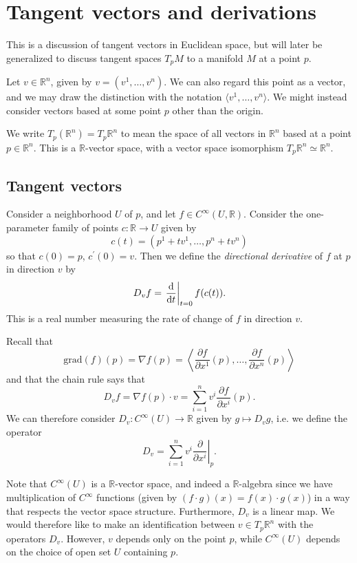 \section{Tangent vectors and derivations}

This is a discussion of tangent vectors in Euclidean space, but will
later be generalized to discuss tangent spaces $T_p M$ to a manifold
$M$ at a point $p$.

Let $v \in \mathbb{R}^n$, given by $v = (v^1, \dots, v^n)$. We can
also regard this point as a vector, and we may draw the distinction
with the notation $\langle v^1, \dots, v^n \rangle$. We might instead
consider vectors based at some point $p$ other than the origin.

We write $T_p(\mathbb{R}^n) = T_p \mathbb{R}^n$ to mean the space of
all vectors in $\mathbb{R}^n$ based at a point $p \in
\mathbb{R}^n$. This is a $\mathbb{R}$-vector space, with a vector
space isomorphism $T_p \mathbb{R}^n \simeq \mathbb{R}^n$.

\subsection{Tangent vectors}

\begin{defn}
Consider a neighborhood $U$ of $p$, and let $f \in
C^\infty(U, \mathbb{R})$. Consider the one-parameter family of points
$c: \mathbb{R} \to U$ given by
$$
  c(t)
= (p^1 + tv^1, \dots, p^n + t v^n)
$$
so that $c(0) = p$, $c^\prime(0) = v$. Then we define the
\emph{directional derivative} of $f$ at $p$ in direction $v$ by
$$
  D_v f
= \left.
    \frac{\mathop{}\!\mathrm{d}}{\mathop{}\!\mathrm{d} t}
  \right|_{t = 0}
    f(c(t)).
$$
This is a real number measuring the rate of change of $f$ in direction
$v$.
\end{defn}

Recall that
$$
  \mathrm{grad}(f)(p)
= \nabla f(p)
= \left\langle
    \frac{\partial f}
         {\partial x^1}(p),
    \dots,
    \frac{\partial f}
         {\partial x^n}(p)
  \right\rangle
$$
and that the chain rule says that
$$
  D_v f
= \nabla f(p) \cdot v
= \sum_{i=1}^n
    v^i
    \frac{\partial f}
         {\partial x^i}(p).
$$
We can therefore consider
$D_v : C^\infty(U) \to \mathbb{R}$
given by $g \mapsto D_v g$, i.e. we define the operator
$$
  D_v
= \sum_{i=1}^n
    v^i
    \left.
      \frac{\partial}
           {\partial x^i}
    \right|_p.
$$

Note that $C^\infty(U)$ is a $\mathbb{R}$-vector space, and indeed a
$\mathbb{R}$-algebra since we have multiplication of $C^\infty$
functions (given by $(f \cdot g)(x) = f(x) \cdot g(x)$) in a way that respects the vector space
structure. Furthermore, $D_v$ is a linear map. We would therefore like
to make an identification between $v \in T_p \mathbb{R}^n$ with the
operators $D_v$. However, $v$ depends only on the point $p$, while
$C^\infty(U)$ depends on the choice of open set $U$ containing $p$.

